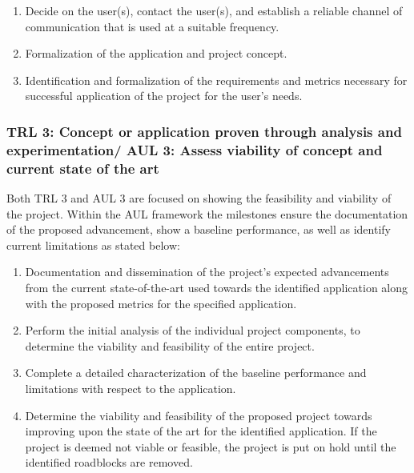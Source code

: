 \documentclass[referee,a4paper,12pt,traditabstract]{swsc}
\begin{document}
\begin{linenumbers}
\begin{enumerate}
\item Decide on the user(s), contact the user(s), and establish a reliable channel of communication that is used at a suitable frequency.
\item Formalization of the application and project concept.
\item Identification and formalization of the requirements and metrics necessary for successful application of the project for the user's needs. 
\end{enumerate}

\subsubsection{TRL 3: Concept or application proven through analysis and experimentation/ AUL 3: Assess viability of concept and current state of the art }
Both TRL 3 and AUL 3 are focused on showing the feasibility and viability of the project. Within the AUL framework the milestones ensure the documentation of the proposed advancement, show a baseline performance, as well as identify current limitations as stated below: \\

\begin{enumerate}
\item Documentation and dissemination of the project's expected advancements from the current state-of-the-art used towards the identified application along with the proposed metrics for the specified application. 
\item Perform the initial analysis of the individual project components, to determine the viability and feasibility of the entire project.
\item Complete a detailed characterization of the baseline performance and limitations with respect to the application.
\item Determine the viability and feasibility of the proposed project towards improving upon the state of the art for the identified application. If the project is deemed not viable or feasible, the project is put on hold until the identified roadblocks are removed.
\end{enumerate}



\end{linenumbers}
\end{document}

